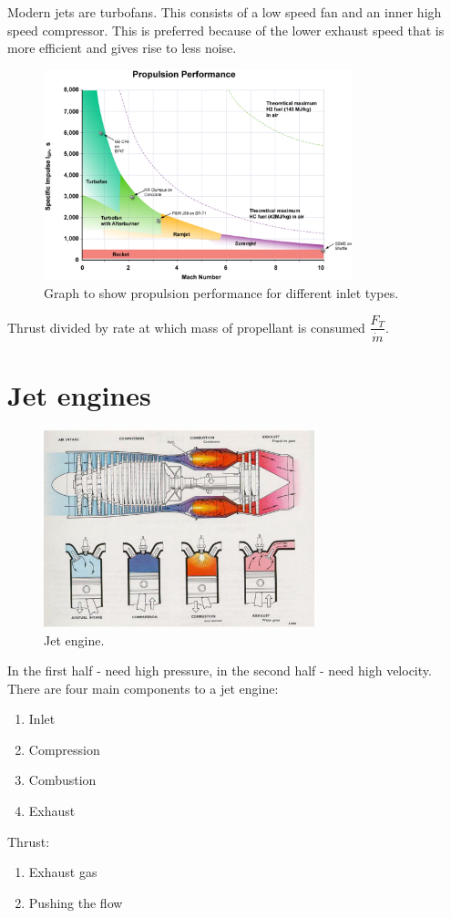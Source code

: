 Modern jets are turbofans. This consists of a low speed fan and an inner high speed compressor. This is preferred because of the lower exhaust speed that is more efficient and gives rise to less noise.
\begin{figure}[H]
    \centering
    \includegraphics[width = 0.8\textwidth]{./img/diagram42.png}
    \caption{Graph to show propulsion performance for different inlet types.}
\end{figure}
Thrust divided by rate at which mass of propellant is consumed $\dfrac{F_T}{\dot{m}}$.
\section{Jet engines}
\begin{figure}[H]
    \centering
    \includegraphics[width = 0.7\textwidth]{./img/diagram43.png}
    \caption{Jet engine.}
\end{figure}
In the first half - need high pressure, in the second half - need high velocity. There are four main components to a jet engine:
\begin{enumerate}
    \item Inlet
    \item Compression
    \item Combustion
    \item Exhaust
\end{enumerate}
Thrust:
\begin{enumerate}
    \item Exhaust gas
    \item Pushing the flow
\end{enumerate}
